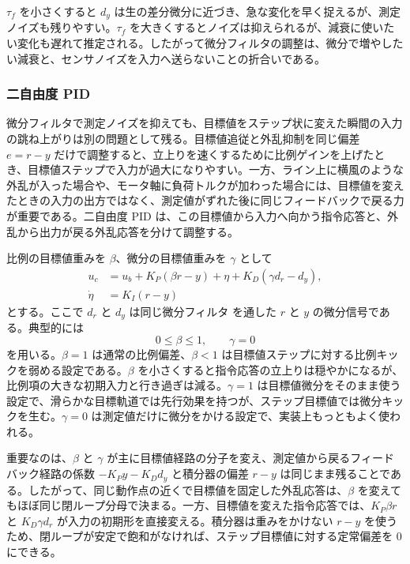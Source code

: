 $\tau_f$ を小さくすると $d_y$ は生の差分微分に近づき、急な変化を早く捉えるが、測定ノイズも残りやすい。$\tau_f$ を大きくするとノイズは抑えられるが、減衰に使いたい変化も遅れて推定される。したがって微分フィルタの調整は、微分で増やしたい減衰と、センサノイズを入力へ送らないことの折合いである。

\subsubsection{二自由度 PID}

微分フィルタで測定ノイズを抑えても、目標値をステップ状に変えた瞬間の入力の跳ね上がりは別の問題として残る。目標値追従と外乱抑制を同じ偏差 $e=r-y$ だけで調整すると、立上りを速くするために比例ゲインを上げたとき、目標値ステップで入力が過大になりやすい。一方、ライン上に横風のような外乱が入った場合や、モータ軸に負荷トルクが加わった場合には、目標値を変えたときの入力の出方ではなく、測定値がずれた後に同じフィードバックで戻る力が重要である。二自由度 PID は、この目標値から入力へ向かう指令応答と、外乱から出力が戻る外乱応答を分けて調整する。

比例の目標値重みを $\beta$、微分の目標値重みを $\gamma$ として
\begin{align}
  u_c&=u_b+K_P(\beta r-y)+\eta
  +K_D(\gamma d_r-d_y),\\
  \dot{\eta}&=K_I(r-y)
  \label{eq:two-degree-pid}
\end{align}
とする。ここで $d_r$ と $d_y$ は同じ微分フィルタ  を通した $r$ と $y$ の微分信号である。典型的には
\begin{equation}
  0\leq\beta\leq1,
  \qquad
  \gamma=0
\end{equation}
を用いる。$\beta=1$ は通常の比例偏差、$\beta<1$ は目標値ステップに対する比例キックを弱める設定である。$\beta$ を小さくすると指令応答の立上りは穏やかになるが、比例項の大きな初期入力と行き過ぎは減る。$\gamma=1$ は目標値微分をそのまま使う設定で、滑らかな目標軌道では先行効果を持つが、ステップ目標値では微分キックを生む。$\gamma=0$ は測定値だけに微分をかける設定で、実装上もっともよく使われる。

重要なのは、$\beta$ と $\gamma$ が主に目標値経路の分子を変え、測定値から戻るフィードバック経路の係数 $-K_Py-K_Dd_y$ と積分器の偏差 $r-y$ は同じまま残ることである。したがって、同じ動作点の近くで目標値を固定した外乱応答は、$\beta$ を変えてもほぼ同じ閉ループ分母で決まる。一方、目標値を変えた指令応答では、$K_P\beta r$ と $K_D\gamma d_r$ が入力の初期形を直接変える。積分器は重みをかけない $r-y$ を使うため、閉ループが安定で飽和がなければ、ステップ目標値に対する定常偏差を 0 にできる。

